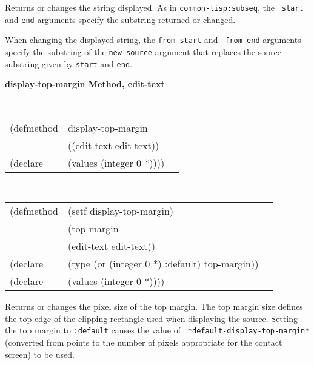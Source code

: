 \begin{flushright} \parbox[t]{6.125in}{
Returns or changes the string displayed. As in {\tt common-lisp:subseq}, the {\tt
start} and {\tt end} arguments specify the substring returned or
changed.

When changing the displayed string, the {\tt from-start} and {\tt
from-end} arguments specify the substring of the {\tt new-source}
argument that replaces the source substring given by {\tt start} and
{\tt end}.}
 \end{flushright}





{\samepage  
{\large {\bf display-top-margin \hfill Method, edit-text}}
\begin{flushright} \parbox[t]{6.125in}{
\tt
\begin{tabular}{lll}
\raggedright
(defmethod & display-top-margin & \\
& ((edit-text  edit-text)) \\
(declare & (values (integer 0 *))))
\end{tabular}
\rm

}\end{flushright}}

\begin{flushright} \parbox[t]{6.125in}{
\tt
\begin{tabular}{lll}
\raggedright
(defmethod & (setf display-top-margin) & \\
         & (top-margin \\
         & (edit-text  edit-text)) \\
(declare &(type (or (integer 0 *) :default)  top-margin))\\
(declare & (values (integer 0 *))))
\end{tabular}
\rm}
\end{flushright}

\begin{flushright} \parbox[t]{6.125in}{
Returns or changes the pixel size of the
top margin.  The top margin size defines
the top edge of the clipping rectangle used when displaying the source.
Setting the top margin to {\tt :default} causes the value of {\tt
*default-display-top-margin*} (converted from points to the number of pixels
appropriate for the contact screen) to be used.
}
\end{flushright}


